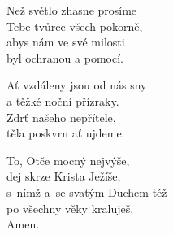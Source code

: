 \begin{translatioMulticol}{3}
Než světlo zhasne prosíme\\
Tebe tvůrce všech pokorně,\\
abys nám ve své milosti\\
byl ochranou a pomocí.\columnbreak

Ať vzdáleny jsou od nás sny\\
a těžké noční přízraky.\\
Zdrť našeho nepřítele,\\
těla poskvrn ať ujdeme.\columnbreak

To, Otče mocný nejvýše,\\
dej skrze Krista Ježíše,\\
s~nímž a~se svatým Duchem též\\
po všechny věky kraluješ.\\
Amen.
\end{translatioMulticol}
